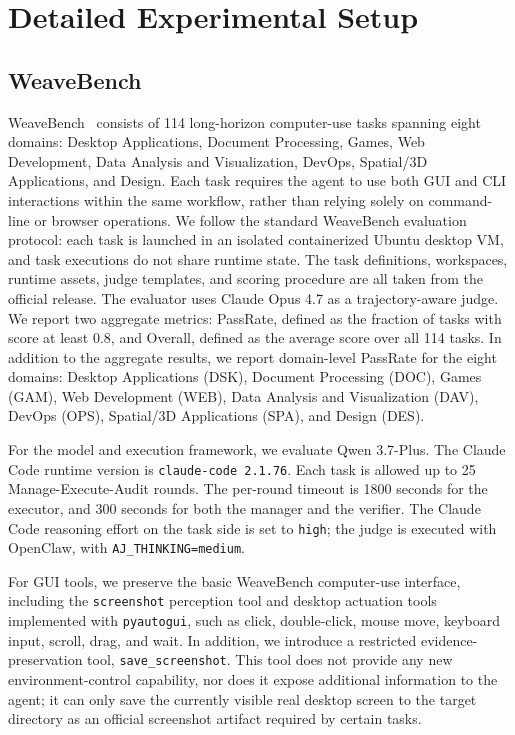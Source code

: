 \appendix
\section{Detailed Experimental Setup}
\subsection{WeaveBench}
WeaveBench~\cite{weavebench} consists of 114 long-horizon computer-use tasks spanning eight domains: Desktop Applications, Document Processing, Games, Web Development, Data Analysis and Visualization, DevOps, Spatial/3D Applications, and Design. Each task requires the agent to use both GUI and CLI interactions within the same workflow, rather than relying solely on command-line or browser operations. We follow the standard WeaveBench evaluation protocol: each task is launched in an isolated containerized Ubuntu desktop VM, and task executions do not share runtime state. The task definitions, workspaces, runtime assets, judge templates, and scoring procedure are all taken from the official release. The evaluator uses Claude Opus 4.7 as a trajectory-aware judge. We report two aggregate metrics: PassRate, defined as the fraction of tasks with score at least 0.8, and Overall, defined as the average score over all 114 tasks. In addition to the aggregate results, we report domain-level PassRate for the eight domains: Desktop Applications (DSK), Document Processing (DOC), Games (GAM), Web Development (WEB), Data Analysis and Visualization (DAV), DevOps (OPS), Spatial/3D Applications (SPA), and Design (DES).

For the model and execution framework, we evaluate Qwen 3.7-Plus. The Claude Code runtime version is \texttt{claude-code 2.1.76}. Each task is allowed up to 25 Manage-Execute-Audit rounds. The per-round timeout is 1800 seconds for the executor, and 300 seconds for both the manager and the verifier. The Claude Code reasoning effort on the task side is set to \texttt{high}; the judge is executed with OpenClaw, with \texttt{AJ\_THINKING=medium}.

For GUI tools, we preserve the basic WeaveBench computer-use interface, including the \texttt{screenshot} perception tool and desktop actuation tools implemented with \texttt{pyautogui}, such as click, double-click, mouse move, keyboard input, scroll, drag, and wait. In addition, we introduce a restricted evidence-preservation tool, \texttt{save\_screenshot}. This tool does not provide any new environment-control capability, nor does it expose additional information to the agent; it can only save the currently visible real desktop screen to the target directory as an official screenshot artifact required by certain tasks.

